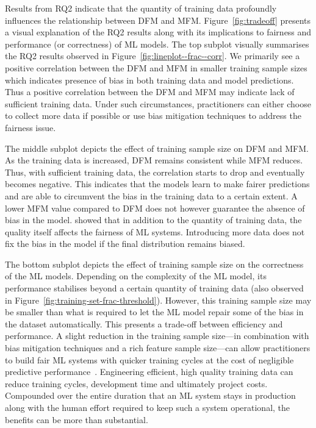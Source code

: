 \documentclass[conference,review,anonymous]{IEEEtran}
\begin{document}
Results from RQ2 indicate that the quantity of training data
profoundly influences the relationship between DFM and MFM.
Figure \ref{fig:tradeoff} presents a visual explanation of the RQ2
results along with its implications to fairness and performance (or
correctness) of ML models. The top subplot visually summarises the RQ2
results observed in Figure \ref{fig:lineplot--frac--corr}. We
primarily see a positive correlation between the DFM and MFM in
smaller training sample sizes which indicates presence of bias in both
training data and model predictions. Thus a positive correlation
between the DFM and MFM may indicate lack of sufficient training data.
Under such circumstances, practitioners can either choose to collect
more data if possible or use bias mitigation techniques to address the
fairness issue.

The middle subplot depicts the effect of training sample size on DFM
and MFM. As the training data is increased, DFM remains consistent
while MFM reduces. Thus, with sufficient training data, the
correlation starts to drop and eventually becomes negative. This
indicates that the models learn to make fairer predictions and are
able to circumvent the bias in the training data to a certain extent.
A lower MFM value compared to DFM does not however guarantee the
absence of bias in the model. \cite{zhang2021ignorance} showed
that in addition to the quantity of training data, the quality itself
affects the fairness of ML systems. Introducing more data does not fix
the bias in the model if the final distribution remains biased.

The bottom subplot depicts the effect of training sample size on the
correctness of the ML models. Depending on the complexity of the ML
model, its performance stabilises beyond a certain quantity of
training data (also observed in
Figure \ref{fig:training-set-frac-threshold}). However, this training
sample size may be smaller than what is required to let the ML model
repair some of the bias in the dataset automatically. This presents a
trade-off between efficiency and performance. A slight reduction in
the training sample size---in combination with bias mitigation
techniques and a rich feature sample size---can allow practitioners to
build fair ML systems with quicker training cycles at the cost of
negligible predictive
performance \cite{verdecchia2022data,zhang2021ignorance}. Engineering
efficient, high quality training data can reduce training cycles,
development time and ultimately project costs. Compounded over the
entire duration that an ML system stays in production along with the
human effort required to keep such a system operational, the benefits
can be more than substantial.
\end{document}
